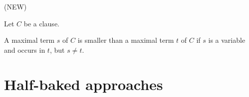 \documentclass[,%
	paper=a4,%
	DIV14, 
	liststotoc,
	bibtotoc,
	draft=false,%
	numbers=noendperiod
]{scrartcl}
\begin{document}
\begin{defi}
	\label{def:order}
	(NEW)

	Let $C$ be a clause.

	A maximal term $s$ of $C$ is smaller than a maximal term $t$ of $C$ if $s$ is a variable and occurs in $t$, but $s\neq t$. 

\end{defi}

\section{Half-baked approaches}
\end{document}
